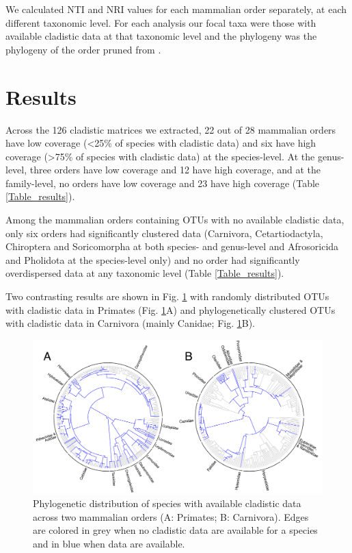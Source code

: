 We calculated NTI and NRI values for each mammalian order separately, at each different taxonomic level. 
For each analysis our focal taxa were those with available cladistic data at that taxonomic level and the phylogeny was the phylogeny of the order pruned from \citep{BinindaEmonds}.

%
%

\section{Results}
Across the 126 cladistic matrices we extracted, 22 out of 28 mammalian orders have low coverage (\textless 25\% of species with cladistic data) and six have high coverage (\textgreater 75\% of species with cladistic data) at the species-level.
At the genus-level, three orders have low coverage and 12 have high coverage, and at the family-level, no orders have low coverage and 23 have high coverage (Table \ref{Table_results}).



Among the mammalian orders containing OTUs with no available cladistic data, only six orders had significantly clustered data (Carnivora, Cetartiodactyla, Chiroptera and Soricomorpha at both species- and genus-level and Afrosoricida and Pholidota at the species-level only) and no order had significantly overdispersed data at any taxonomic level (Table \ref{Table_results}).

Two contrasting results are shown in Fig. \ref{Figure_example_coverage} with randomly distributed OTUs with cladistic data in Primates (Fig. \ref{Figure_example_coverage}A) and phylogenetically clustered OTUs with cladistic data in Carnivora (mainly Canidae; Fig. \ref{Figure_example_coverage}B).

\begin{figure}[!h]
\centering
    \includegraphics[width=1\textwidth]{Missing_mammals/Figures/example_coverage.pdf}
\caption[Phylogenetic distribution of species with available cladistic data across Primates and Carnivora]{Phylogenetic distribution of species with available cladistic data across two mammalian orders (A: Primates; B: Carnivora).
Edges are colored in grey when no cladistic data are available for a species and in blue when data are available.}
\label{Figure_example_coverage}
\end{figure}

